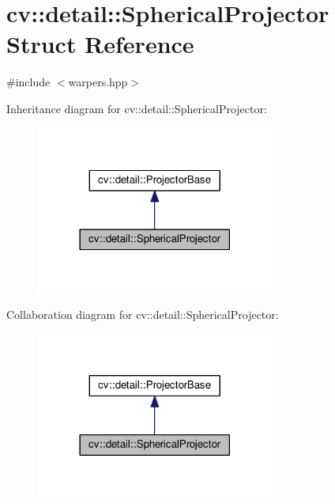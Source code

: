 \hypertarget{structcv_1_1detail_1_1SphericalProjector}{\section{cv\-:\-:detail\-:\-:Spherical\-Projector Struct Reference}
\label{structcv_1_1detail_1_1SphericalProjector}
}


{\ttfamily \#include $<$warpers.\-hpp$>$}



Inheritance diagram for cv\-:\-:detail\-:\-:Spherical\-Projector\-:\nopagebreak
\begin{figure}[H]
\begin{center}
\leavevmode
\includegraphics[width=222pt]{structcv_1_1detail_1_1SphericalProjector__inherit__graph}
\end{center}
\end{figure}


Collaboration diagram for cv\-:\-:detail\-:\-:Spherical\-Projector\-:\nopagebreak
\begin{figure}[H]
\begin{center}
\leavevmode
\includegraphics[width=222pt]{structcv_1_1detail_1_1SphericalProjector__coll__graph}
\end{center}
\end{figure}
